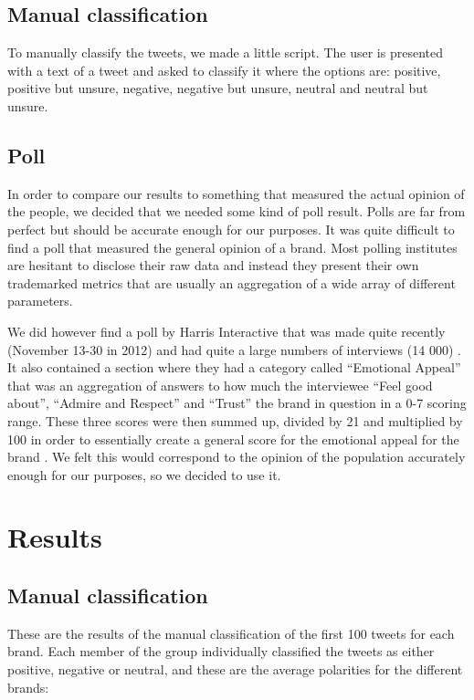 \documentclass[a4paper,12pt]{report}
\begin{document}
\section{Manual classification}

To manually classify the tweets, we made a little script.
The user is presented with a text of a tweet and asked to classify it where the options are: positive, positive but unsure, negative, negative but unsure, neutral and neutral but unsure.

\section{Poll}

In order to compare our results to something that measured the actual opinion of the people, we decided that we needed some kind of poll result. 
Polls are far from perfect but should be accurate enough for our purposes. It was quite difficult to find a poll that measured the general opinion of a brand. 
Most polling institutes are hesitant to disclose their raw data and instead they present their own trademarked metrics that are usually an aggregation of a wide array of different parameters.

We did however find a poll by Harris Interactive that was made quite recently (November 13-30 in 2012) and had quite a large numbers of interviews (14 000) \cite{Harris13}. 
It also contained a section where they had a category called “Emotional Appeal” that was an aggregation of answers to how much the interviewee “Feel good about”, “Admire and Respect” and “Trust” the brand in question in a 0-7 scoring range. 
These three scores were then summed up, divided by 21 and multiplied by 100 in order to essentially create a general score for the emotional appeal for the brand \cite{Harris13}. 
We felt this would correspond to the opinion of the population accurately enough for our purposes, so we decided to use it.

\chapter{Results}

\section{Manual classification}

These are the results of the manual classification of the first 100 tweets for each brand. Each member of the group individually classified the tweets as either positive, negative or neutral, and these are the average polarities for the different brands:
\end{document}
